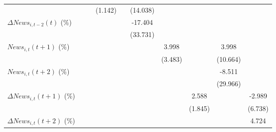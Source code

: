 {\begin{tabular}{l*{9}{c}}
                    &                     &                     &     (1.142)         &                     &    (14.038)         &                     &                     &                     &                     \\
\addlinespace
$ \Delta News_{i,t-2}(t)$ (\%)&                     &                     &                     &                     &     -17.404         &                     &                     &                     &                     \\
                    &                     &                     &                     &                     &    (33.731)         &                     &                     &                     &                     \\
\addlinespace
$ News_{i,t}(t+1)$ (\%)&                     &                     &                     &                     &                     &       3.998         &                     &       3.998         &                     \\
                    &                     &                     &                     &                     &                     &     (3.483)         &                     &    (10.664)         &                     \\
\addlinespace
$ News_{i,t}(t+2)$ (\%)&                     &                     &                     &                     &                     &                     &                     &      -8.511         &                     \\
                    &                     &                     &                     &                     &                     &                     &                     &    (29.966)         &                     \\
\addlinespace
$ \Delta News_{i,t}(t+1)$ (\%)&                     &                     &                     &                     &                     &                     &       2.588         &                     &      -2.989         \\
                    &                     &                     &                     &                     &                     &                     &     (1.845)         &                     &     (6.738)         \\
\addlinespace
$ \Delta News_{i,t}(t+2)$ (\%)&                     &                     &                     &                     &                     &                     &                     &                     &       4.724         \\

\end{tabular}}
